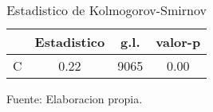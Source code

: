 \begin{table}[H]
\centering
\begin{tabular}{c|c|c|c|}
\cline{2-4}
                                & Estadistico & g.l. & valor-p \\ \hline
\multicolumn{1}{|c|}{C} & 0.22        & 9065 & 0.00    \\ \hline
\end{tabular}
\caption{Estadistico de Kolmogorov-Smirnov}
Fuente: Elaboracion propia.
\label{KStable}
\end{table}
